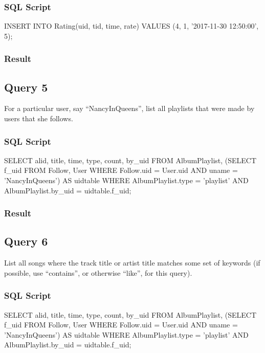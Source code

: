 \documentclass[letter, 12pt]{report}
\begin{document}
	\subsubsection{SQL Script}
	\begin{spverbatim}
		INSERT INTO Rating(uid, tid, time, rate) VALUES (4, 1, '2017-11-30 12:50:00', 5);
	\end{spverbatim}
	\subsubsection{Result}
	
	\subsection{Query 5}
	For a particular user, say “NancyInQueens”, list all playlists that were made by users that she follows.
	\subsubsection{SQL Script}
	\begin{spverbatim}
		SELECT alid, title, time, type, count, by_uid FROM AlbumPlaylist,
		(SELECT f_uid FROM Follow, User
		WHERE Follow.uid = User.uid
		AND uname = 'NancyInQueens') AS uidtable
		WHERE AlbumPlaylist.type = 'playlist'
		AND AlbumPlaylist.by_uid = uidtable.f_uid;
	\end{spverbatim}
	\subsubsection{Result}
	
	\subsection{Query 6}
	List all songs where the track title or artist title matches some set of keywords (if possible, use
	``contains'', or otherwise ``like'', for this query).
	\subsubsection{SQL Script}
	\begin{spverbatim}
		SELECT alid, title, time, type, count, by_uid FROM AlbumPlaylist,
		(SELECT f_uid FROM Follow, User
		WHERE Follow.uid = User.uid
		AND uname = 'NancyInQueens') AS uidtable
		WHERE AlbumPlaylist.type = 'playlist'
		AND AlbumPlaylist.by_uid = uidtable.f_uid;
	\end{spverbatim}
\end{document}
